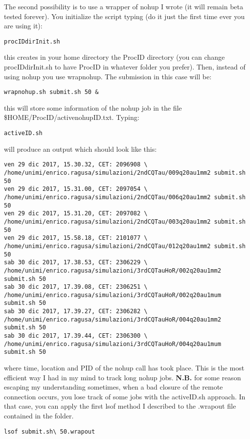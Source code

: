 \documentclass[10pt,a4paper,twoside]{article} %
\begin{document}
The second possibility is to use a wrapper of nohup I wrote (it will remain beta tested forever). You initialize the script typing (do it just the first time ever you are using it):
\begin{verbatim}
procIDdirInit.sh
\end{verbatim}
this creates in your home directory the ProcID directory (you can change procIDdirInit.sh to have ProcID in whatever folder you prefer).
Then, instead of using nohup you use wrapnohup. The submission in this case will be:
\begin{verbatim}
wrapnohup.sh submit.sh 50 &
\end{verbatim}
this will store some information of the nohup job in the file \$HOME/ProcID/activenohupID.txt. Typing:
\begin{verbatim}
activeID.sh
\end{verbatim}
will produce an output which should look like this:
\begin{verbatim}
ven 29 dic 2017, 15.30.32, CET: 2096908 \
/home/unimi/enrico.ragusa/simulazioni/2ndCQTau/009q20au1mm2 submit.sh 50
ven 29 dic 2017, 15.31.00, CET: 2097054 \ 
/home/unimi/enrico.ragusa/simulazioni/2ndCQTau/006q20au1mm2 submit.sh 50
ven 29 dic 2017, 15.31.20, CET: 2097082 \
/home/unimi/enrico.ragusa/simulazioni/2ndCQTau/003q20au1mm2 submit.sh 50
ven 29 dic 2017, 15.58.18, CET: 2101077 \
/home/unimi/enrico.ragusa/simulazioni/2ndCQTau/012q20au1mm2 submit.sh 50
sab 30 dic 2017, 17.38.53, CET: 2306229 \
/home/unimi/enrico.ragusa/simulazioni/3rdCQTauHoR/002q20au1mm2 submit.sh 50
sab 30 dic 2017, 17.39.08, CET: 2306251 \
/home/unimi/enrico.ragusa/simulazioni/3rdCQTauHoR/002q20au1mum submit.sh 50
sab 30 dic 2017, 17.39.27, CET: 2306282 \
/home/unimi/enrico.ragusa/simulazioni/3rdCQTauHoR/004q20au1mm2 submit.sh 50
sab 30 dic 2017, 17.39.44, CET: 2306300 \
/home/unimi/enrico.ragusa/simulazioni/3rdCQTauHoR/004q20au1mum submit.sh 50
\end{verbatim}
where time, location and PID of the nohup call has took place. This is the most efficient way I had in my mind to track long nohup jobs.
\textbf{N.B.} for some reason escaping my understanding sometimes, when a bad closure of the remote connection occurs, you lose track of some jobs with the activeID.sh approach. In that case, you can apply the first lsof method I described to the .wrapout file contained in the folder.
\begin{verbatim}
lsof submit.sh\ 50.wrapout
\end{verbatim}
\end{document}
